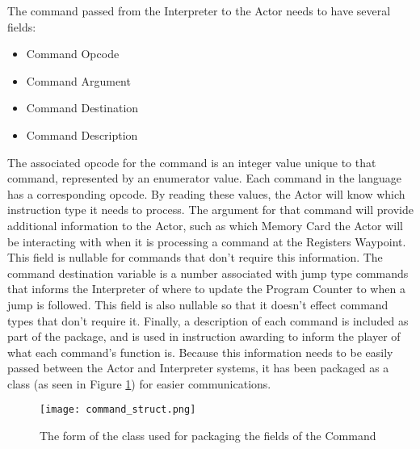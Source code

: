 The command passed from the Interpreter to the Actor needs to have several fields:
\begin{itemize}
	\item Command Opcode
	\item Command Argument
	\item Command Destination
	\item Command Description
\end{itemize}
The associated opcode for the command is an integer value unique to that command, represented by an enumerator value. Each command in the language has a corresponding opcode. By reading these values, the Actor will know which instruction type it needs to process. The argument for that command will provide additional information to the Actor, such as which Memory Card the Actor will be interacting with when it is processing a command at the Registers Waypoint. This field is nullable for commands that don't require this information. The command destination variable is a number associated with jump type commands that informs the Interpreter of where to update the Program Counter to when a jump is followed. This field is also nullable so that it doesn't effect command types that don't require it. Finally, a description of each command is included as part of the package, and is used in instruction awarding to inform the player of what each command's function is. Because this information needs to be easily passed between the Actor and Interpreter systems, it has been packaged as a class (as seen in Figure \ref{fig:command_struct}) for easier communications. \\

\begin{figure}[!htb]
  \caption{The form of the class used for packaging the fields of the Command}
  \label{fig:command_struct}
  \centering
  \texttt{[image: command\_struct.png]}
\end{figure}

